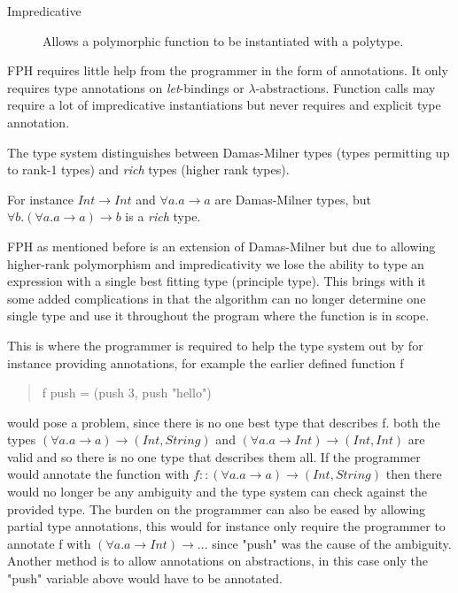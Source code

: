 \documentclass[12pt, a4paper, oneside]{article}
\begin{document}
\begin{description}
\item[Impredicative] Allows a polymorphic function to be instantiated with a polytype. 
\end{description}

FPH requires little help from the programmer in the form of annotations. It only requires type annotations on \textit{let}-bindings or $\lambda$-abstractions. Function calls may require a lot of impredicative instantiations but never requires and explicit type annotation.

The type system distinguishes between Damas-Milner types (types permitting up to rank-1 types) and \textit{rich} types (higher rank types).


For instance $Int \rightarrow Int$ and $\forall a. a \rightarrow a$ are Damas-Milner types, but $\forall b.(\forall a. a \rightarrow a) \rightarrow b$ is a \textit{rich} type.

FPH as mentioned before is an extension of Damas-Milner but due to allowing higher-rank polymorphism and impredicativity we lose the ability to type an expression with a single best fitting type (principle type). This brings with it some added complications in that the algorithm can no longer determine one single type and use it throughout the program where the function is in scope.

This is where the programmer is required to help the type system out by for instance providing annotations, for example the earlier defined function f
\begin{quotation}
f push = (push 3, push "hello")
\end{quotation}
would pose a problem, since there is no one best type that describes f.
both the types $(\forall a. a \rightarrow a) \rightarrow (Int, String)$ and $(\forall a. a \rightarrow Int) \rightarrow (Int, Int)$ are valid and so there is no one type that describes them all.
If the programmer would annotate the function with $f::(\forall a. a \rightarrow a) \rightarrow (Int, String)$ then there would no longer be any ambiguity and the type system can check against the provided type.
The burden on the programmer can also be eased by allowing partial type annotations, this would for instance only require the programmer to annotate f with $(\forall a. a \rightarrow Int) \rightarrow ...$ since "push" was the cause of the ambiguity. Another method is to allow annotations on abstractions, in this case only the "push" variable above would have to be annotated.
\end{document}
